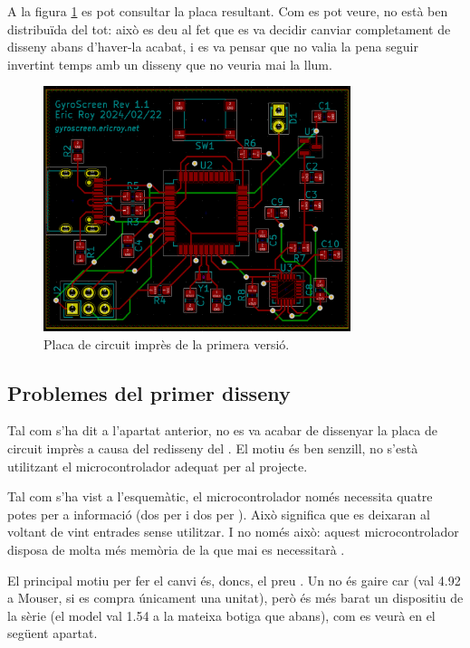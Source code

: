 A la figura \ref{fig:pcb_v1} es pot consultar la placa resultant. Com es pot veure,
no està ben distribuïda del tot: això es deu al fet que es va decidir canviar 
completament de disseny abans d'haver-la acabat, i es va pensar que no valia la 
pena seguir invertint temps amb un disseny que no veuria mai la llum.

\begin{figure}[ht]
    \centering
    \includegraphics[width=0.8\textwidth]{images/kicad/gyro1_pcb.png}
    \caption{Placa de circuit imprès de la primera versió.}
    \label{fig:pcb_v1}
\end{figure}

\subsection{Problemes del primer disseny}

Tal com s'ha dit a l'apartat anterior, no es va acabar de dissenyar la placa
de circuit imprès a causa del redisseny del . El motiu és ben senzill,
no s'està utilitzant el microcontrolador adequat per al projecte.

Tal com s'ha vist a l'esquemàtic, el microcontrolador només necessita quatre potes
per a informació (dos per  i dos per ). Això significa que es
deixaran al voltant de vint entrades sense utilitzar. I no només això: aquest
microcontrolador disposa de molta més memòria de la que mai es necessitarà
\cite{AtMega32u4}.

El principal motiu per fer el canvi és, doncs, el preu \cite{AvrComparison}.
Un  no és gaire car (val \SI{4.92}{\EUR} a Mouser, si es compra
únicament una unitat), però és més barat un dispositiu  de la sèrie
 (el model  val \SI{1.54}{\EUR} a la mateixa
botiga que abans), com es veurà en el següent apartat.

